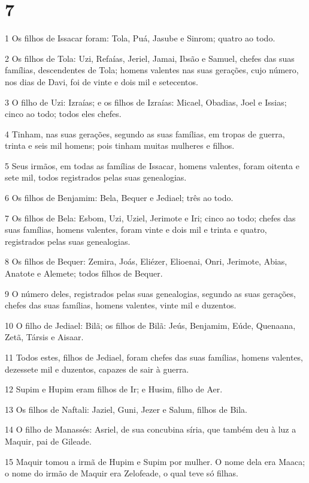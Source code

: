 \chapter{7}

\par 1 Os filhos de Issacar foram: Tola, Puá, Jasube e Sinrom; quatro ao todo.
\par 2 Os filhos de Tola: Uzi, Refaías, Jeriel, Jamai, Ibsão e Samuel, chefes das suas famílias, descendentes de Tola; homens valentes nas suas gerações, cujo número, nos dias de Davi, foi de vinte e dois mil e setecentos.
\par 3 O filho de Uzi: Izraías; e os filhos de Izraías: Micael, Obadias, Joel e Issias; cinco ao todo; todos eles chefes.
\par 4 Tinham, nas suas gerações, segundo as suas famílias, em tropas de guerra, trinta e seis mil homens; pois tinham muitas mulheres e filhos.
\par 5 Seus irmãos, em todas as famílias de Issacar, homens valentes, foram oitenta e sete mil, todos registrados pelas suas genealogias.
\par 6 Os filhos de Benjamim: Bela, Bequer e Jediael; três ao todo.
\par 7 Os filhos de Bela: Esbom, Uzi, Uziel, Jerimote e Iri; cinco ao todo; chefes das suas famílias, homens valentes, foram vinte e dois mil e trinta e quatro, registrados pelas suas genealogias.
\par 8 Os filhos de Bequer: Zemira, Joás, Eliézer, Elioenai, Onri, Jerimote, Abias, Anatote e Alemete; todos filhos de Bequer.
\par 9 O número deles, registrados pelas suas genealogias, segundo as suas gerações, chefes das suas famílias, homens valentes, vinte mil e duzentos.
\par 10 O filho de Jediael: Bilã; os filhos de Bilã: Jeús, Benjamim, Eúde, Quenaana, Zetã, Társis e Aisaar.
\par 11 Todos estes, filhos de Jediael, foram chefes das suas famílias, homens valentes, dezessete mil e duzentos, capazes de sair à guerra.
\par 12 Supim e Hupim eram filhos de Ir; e Husim, filho de Aer.
\par 13 Os filhos de Naftali: Jaziel, Guni, Jezer e Salum, filhos de Bila.
\par 14 O filho de Manassés: Asriel, de sua concubina síria, que também deu à luz a Maquir, pai de Gileade.
\par 15 Maquir tomou a irmã de Hupim e Supim por mulher. O nome dela era Maaca; o nome do irmão de Maquir era Zelofeade, o qual teve só filhas.
